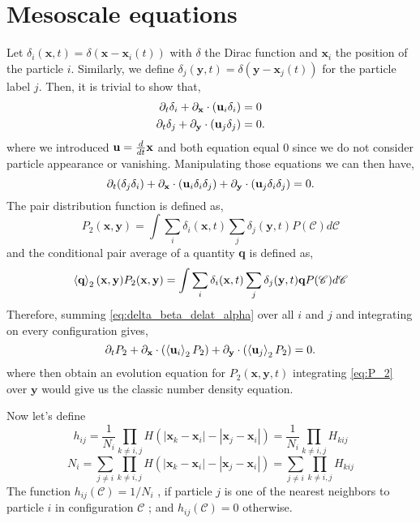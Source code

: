 \section{Mesoscale equations}

Let $\delta_i(\textbf{x},t) = \delta(\textbf{x} - \textbf{x}_i(t))$ with $\delta$ the Dirac function and $\textbf{x}_i$ the position of the particle $i$.  
Similarly, we define $\delta_j(\textbf{y},t) =\delta(\textbf{y} - \textbf{x}_j(t)) $ for the particle label $j$. 
Then, it is trivial to show that, 
\begin{align*}
    \partial_t \delta_i + \partial_\textbf{x} \cdot (\textbf{u}_i \delta_i) &= 0\\
    \partial_t \delta_j + \partial_\textbf{y} \cdot (\textbf{u}_j \delta_j) &= 0.
\end{align*}
where we introduced $\textbf{u} = \frac{d}{d t} \textbf{x}$
and both equation equal $0$ since we do not consider particle appearance or vanishing. 
Manipulating those equations we can then have, 
\begin{equation}
    \partial_t (\delta_j\delta_i) + \partial_\textbf{x} \cdot (\textbf{u}_i \delta_i\delta_j) + \partial_\textbf{y} \cdot (\textbf{u}_j \delta_i\delta_j) = 0.
    \label{eq:delta_beta_delat_alpha}
\end{equation}
The pair distribution function is defined as,
\begin{equation}
    P_2(\textbf{x},\textbf{y}) = \int \sum_i\delta_i(\textbf{x},t) \sum_j\delta_j(\textbf{y},t) P(\mathscr{C})d\mathscr{C}
\end{equation}
and the conditional pair average of a quantity \textbf{q} is defined as, 
\begin{equation}
    \left<\textbf{q}\right>_2(\textbf{x},\textbf{y})P_2(\textbf{x},\textbf{y}) = \int \sum_i\delta_i(\textbf{x},t) \sum_j\delta_j(\textbf{y},t) \textbf{q} P(\mathscr{C})d\mathscr{C}
\end{equation}
Therefore, summing \ref{eq:delta_beta_delat_alpha} over all $i$ and $j$ and integrating on every configuration gives, 
\begin{equation}
    \partial_t P_2 + \partial_\textbf{x} \cdot (\left<\textbf{u}_i\right>_2P_2) + \partial_\textbf{y} \cdot (\left<\textbf{u}_j\right>_2P_2) = 0.
    \label{eq:P_2}
\end{equation}
where then obtain an evolution equation for $P_2(\textbf{x},\textbf{y},t)$
integrating \ref{eq:P_2} over $\textbf{y}$ would give us the classic number density equation. 

Now let's define 
\begin{equation*}
    h_{ij} 
    = \frac{1}{N_i}
    \prod_{k \neq i,j}
    H(|\textbf{x}_k - \textbf{x}_i| - |\textbf{x}_j - \textbf{x}_i|)
    = \frac{1}{N_i}
    \prod_{k \neq i,j}
    H_{kij}
\end{equation*}
\begin{equation*}
    N_i
    = 
    \sum_{j\neq i}
    \prod_{k \neq i,j}
    H(|\textbf{x}_k - \textbf{x}_i| - |\textbf{x}_j - \textbf{x}_i|)
    = 
    \sum_{j\neq i}
    \prod_{k \neq i,j}
    H_{kij}
\end{equation*}
The function $h_{ij} (\mathscr{C}) = 1/N_i$ , if particle $j$ is one
of the nearest neighbors to particle $i$ in configuration $\mathscr{C}$ ;
and $h_{ij} (\mathscr{C} ) = 0$ otherwise.

